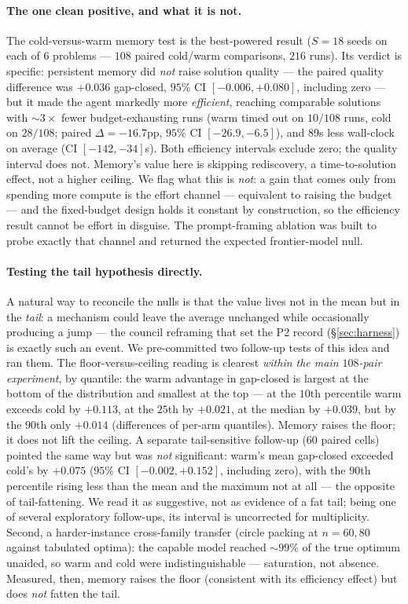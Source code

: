 \documentclass[11pt]{article}
\begin{document}
\paragraph{The one clean positive, and what it is not.}
The cold-versus-warm memory test is the best-powered result ($S{=}18$ seeds on each of $6$
problems --- $108$ paired cold/warm comparisons, $216$ runs). Its verdict is specific:
persistent memory did \emph{not} raise solution quality --- the paired quality difference was
$+0.036$ gap-closed, $95\%$ CI $[-0.006,+0.080]$, including zero --- but it made the agent
markedly more \emph{efficient}, reaching comparable solutions with ${\sim}3\times$ fewer
budget-exhausting runs (warm timed out on $10/108$ runs, cold on $28/108$; paired
$\Delta{=}{-}16.7$pp, $95\%$ CI $[-26.9,-6.5]$), and $89$s less wall-clock on average (CI
$[-142,-34]$s). Both efficiency intervals exclude zero; the quality interval does not. Memory's
value here is skipping rediscovery, a
time-to-solution effect, not a higher ceiling. We flag what this is \emph{not}: a gain that
comes only from spending more compute is the effort channel --- equivalent to raising the
budget --- and the fixed-budget design holds it constant by construction, so the efficiency
result cannot be effort in disguise. The prompt-framing ablation was built to probe exactly
that channel and returned the expected frontier-model null.

\paragraph{Testing the tail hypothesis directly.}
A natural way to reconcile the nulls is that the value lives not in the mean but in the
\emph{tail}: a mechanism could leave the average unchanged while occasionally producing a jump
--- the council reframing that set the P2 record (\S\ref{sec:harness}) is exactly such an event.
We pre-committed two follow-up tests of this idea and ran them. The floor-versus-ceiling reading
is clearest \emph{within the main $108$-pair experiment}, by quantile: the warm advantage in
gap-closed is largest at the bottom of the distribution and smallest at the top --- at the
$10$th percentile warm exceeds cold by $+0.113$, at the $25$th by $+0.021$, at the median by
$+0.039$, but by the $90$th only $+0.014$ (differences of per-arm quantiles). Memory raises the floor; it does not lift the ceiling.
A separate tail-sensitive follow-up ($60$ paired cells) pointed the same way but was \emph{not}
significant: warm's mean gap-closed exceeded cold's by $+0.075$ ($95\%$ CI $[-0.002,+0.152]$,
including zero), with the $90$th percentile rising less than the mean and the maximum not at all
--- the opposite of tail-fattening. We read it as suggestive, not as evidence of a fat tail;
being one of several exploratory follow-ups, its interval is uncorrected for multiplicity. Second, a harder-instance cross-family transfer (circle packing at $n=60,80$
against tabulated optima): the capable model reached ${\sim}99\%$ of the true optimum unaided, so
warm and cold were indistinguishable --- saturation, not absence. Measured, then, memory raises
the floor (consistent with its efficiency effect) but does \emph{not} fatten the tail.
\end{document}
